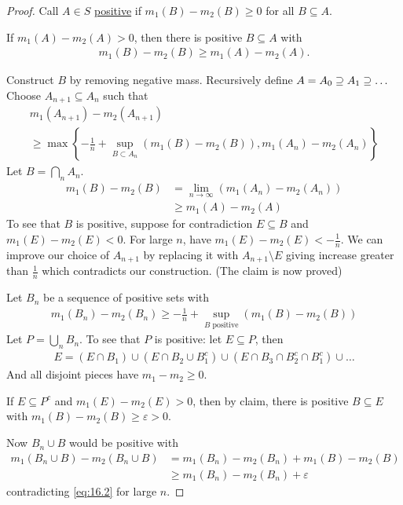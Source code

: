 \begin{proof}
	Call $A \in S$ \underline{positive} if $m_1 (B) - m_2 (B) \geq 0$ for all $B \subseteq A$.

	 \begin{claim}
		 If $m_1 (A) - m_{2} (A) > 0$, then there is positive $B \subseteq A$ with
		 \begin{align*}
			 m_{1} (B) - m_{2} (B) \geq m_1 (A) - m_2 (A).
		 \end{align*}
	\end{claim}
	\noindent Construct $B$ by removing negative mass. Recursively define $A = A_{0} \supseteq A_1 \supseteq \ldots$
	Choose $A_{n+1} \subseteq A_{n}$ such that
	\begin{multline*}
		m_{1} (A_{n+1}) - m_{2} (A_{n+1}) \\
		\geq \max \left\{-\frac{1}{n} + \sup_{B \subset A_n} \left(m_1(B) - m_2(B) \right), m_1(A_n) - m_2(A_n) \right\}
	\end{multline*}
	Let $B = \bigcap_{n} A_{n}$.
	\begin{align*}
		m_{1} (B) - m_{2} (B) &= \lim_{n \to \infty} (m_{1} (A_{n}) - m_{2} (A_{n})) \\
								&\geq m_{1} (A) - m_{2} (A)
	\end{align*}
	To see that $B$ is positive, suppose for contradiction $E \subseteq B$ and $m_{1} (E) - m_{2} (E) < 0$.
	For large $n$, have $m_1 (E) - m_{2} (E) < -\frac{1}{n}$.
	We can improve our choice of $A_{n +1}$ by replacing it with $A_{n +1 } \setminus E$ giving increase greater than $\frac{1}{n}$ which contradicts our construction.
	(The claim is now proved)

	Let $B_{n}$ be a sequence of positive sets with
	\begin{align}\label{eq:16.2}
		m_{1} (B_{n}) - m_{2} (B_{n}) \geq -\frac{1}{n} + \sup_{B \text{ positive}} (m_{1} (B) - m_{2} (B))
	\end{align}
	Let $P = \bigcup_{n} B_{n}$. To see that $P$ is positive: let $E \subseteq P$, then
	\begin{align*}
		E = ( E \cap B_{1} ) \cup ( E \cap B_{2} \cup B_{1}^c) \cup ( E \cap B_{3} \cap B_{2}^{c} \cap B_{1}^c ) \cup \ldots
	\end{align*}
	And all disjoint pieces have $m_{1} - m_{2} \geq 0$.

	If $E \subseteq P^c$ and $m_{1} (E) - m_{2} (E) > 0$, then by claim, there is positive $B \subseteq E$
	with $m_{1} (B) - m_{2} (B) \geq \varepsilon > 0$.

	Now $B_{n} \cup B$ would be positive with
	\begin{align*}
		m_{1} (B_{n} \cup B) - m_{2} (B_{n} \cup B) &= m_{1} (B_{n}) - m_{2} (B_{n} ) + m_{1} (B) - m_{2} (B) \\
													&\geq m_{1} (B_{n}) - m_{2} (B_{n} ) + \varepsilon
	\end{align*}
	contradicting \ref{eq:16.2} for large $n$.
\end{proof}

